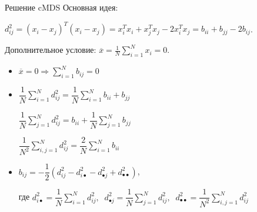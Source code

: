 \documentclass[9pt]{beamer}
\begin{document}
\begin{frame}{Решение cMDS}
    Основная идея: 
    
    $d_{ij}^2 = (x_i - x_j)^T(x_i - x_j) = x_i^Tx_i + x_j^Tx_j - 2x_i^Tx_j = b_{ii} + b_{jj} - 2b_{ij}$.
    
    Дополнительное условие:
        $\overline{x} = \frac{1}{N} \sum_{i = 1}^N x_i = 0$.
        
    \vspace{\baselineskip}  

    

    \begin{itemize}

    \item {$\overline{x} = 0 \Rightarrow \sum_{i=1}^N b_{ij} = 0$}

    \item{$\dfrac{1}{N} \sum\limits_{i=1}^{N} d_{ij}^2 = \dfrac{1}{N} \sum\limits_{i=1}^{N} b_{ii} + b_{jj}$

    $\dfrac{1}{N} \sum\limits_{j=1}^{N} d_{ij}^2 = b_{ii} + \dfrac{1}{N} \sum\limits_{j=1}^{N} b_{jj}$

    $\dfrac{1}{N^2} \sum\limits_{i, j=1}^{N} d_{ij}^2 = \dfrac{2}{N} \sum\limits_{i=1}^{N} b_{ii}$}

    \item{$b_{ij} = -\dfrac{1}{2}(d_{ij}^2 - d_{i \bullet}^2 - d_{\bullet j}^2 + d_{\bullet \bullet}^2)$,
    
    где $d_{i \bullet}^2 = \dfrac{1}{N} \sum\limits_{i=1}^{N} d_{ij}^2, \:$ $d_{\bullet j}^2 = \dfrac{1}{N} \sum\limits_{j=1}^{N} d_{ij}^2, \:$ $d_{\bullet \bullet}^2 = \dfrac{1}{N^2} \sum\limits_{i, j=1}^{N} d_{ij}^2 \:$}
    
    \end{itemize}
\end{frame}
\end{document}
